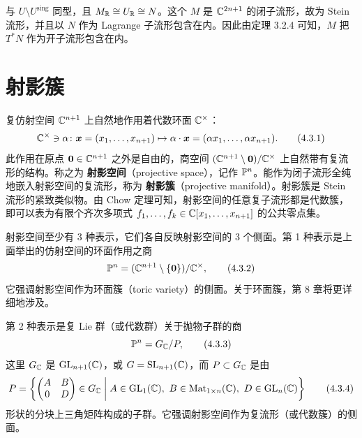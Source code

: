 

与 $U\setminus U^{\mathrm{sing}}$ 同型，且 $M_{\mathbb{R}}\cong U_{\mathbb{R}}\cong N$。这个 $M$ 是 $\mathbb{C}^{2n+1}$ 的闭子流形，故为 Stein 流形，并且以 $N$ 作为 Lagrange 子流形包含在内。因此由定理 3.2.4 可知，$M$ 把 $T^*N$ 作为开子流形包含在内。


\section{射影簇}

复仿射空间 $\mathbb{C}^{n+1}$ 上自然地作用着代数环面 $\mathbb{C}^\times$：
\begin{equation}
  \mathbb{C}^\times\ni\alpha\colon\bm{x} = (x_1,\dots,x_{n+1})\mapsto\alpha\cdot\bm{x} = (\alpha x_1,\dots,\alpha x_{n+1}).
  \tag{4.3.1}
\end{equation}
此作用在原点 $\bm{0}\in\mathbb{C}^{n+1}$ 之外是自由的，商空间 $(\mathbb{C}^{n+1}\setminus\bm{0})/\mathbb{C}^\times$ 上自然带有复流形的结构。称之为 \textbf{射影空间}（projective space），记作 $\mathbb{P}^n$。能作为闭子流形全纯地嵌入射影空间的复流形，称为 \textbf{射影簇}（projective manifold）。射影簇是 Stein 流形的紧致类似物。由 Chow 定理可知，射影空间的任意复子流形都是代数簇，即可以表为有限个齐次多项式 $f_1,\dots,f_k\in\mathbb{C}[x_1,\dots,x_{n+1}]$ 的公共零点集。

射影空间至少有 3 种表示，它们各自反映射影空间的 3 个侧面。第 1 种表示是上面举出的仿射空间的环面作用之商
\begin{equation}
  \mathbb{P}^n = (\mathbb{C}^{n+1}\setminus\{\bm{0}\})/\mathbb{C}^\times,
  \tag{4.3.2}
\end{equation}
它强调射影空间作为环面簇（toric variety）的侧面。关于环面簇，第 8 章将更详细地涉及。

第 2 种表示是复 Lie 群（或代数群）关于抛物子群的商
\begin{equation}
  \mathbb{P}^n = G_{\mathbb{C}}/P,
  \tag{4.3.3}
\end{equation}
这里 $G_{\mathbb{C}}$ 是 $\operatorname{GL}_{n+1}(\mathbb{C})$，或 $G = \operatorname{SL}_{n+1}(\mathbb{C})$，而 $P\subset G_{\mathbb{C}}$ 是由
\begin{equation}
  P = \left\{\begin{pmatrix}A & B\\ 0 & D\end{pmatrix}\in G_\C\;\middle|\;
  A\in\GL_1(\C),\ B\in\operatorname{Mat}_{1\times n}(\C),\ D\in\GL_n(\C)\right\}
  \tag{4.3.4}
\end{equation}
形状的分块上三角矩阵构成的子群。它强调射影空间作为复流形（或代数簇）的侧面。

